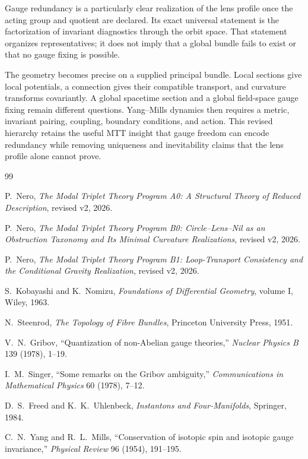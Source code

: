 \documentclass[11pt]{article}
\begin{document}
Gauge redundancy is a particularly clear realization of the lens profile once
the acting group and quotient are declared.  Its exact universal statement is
the factorization of invariant diagnostics through the orbit space.  That
statement organizes representatives; it does not imply that a global bundle
fails to exist or that no gauge fixing is possible.

The geometry becomes precise on a supplied principal bundle.  Local sections
give local potentials, a connection gives their compatible transport, and
curvature transforms covariantly.  A global spacetime section and a global
field-space gauge fixing remain different questions.  Yang--Mills dynamics
then requires a metric, invariant pairing, coupling, boundary conditions, and
action.  This revised hierarchy retains the useful MTT insight that gauge
freedom can encode redundancy while removing uniqueness and inevitability
claims that the lens profile alone cannot prove.

\begin{thebibliography}{99}

P.~Nero,
\newblock \emph{The Modal Triplet Theory Program A0: A Structural Theory of
Reduced Description}, revised v2, 2026.

P.~Nero,
\newblock \emph{The Modal Triplet Theory Program B0: Circle--Lens--Nil as an
Obstruction Taxonomy and Its Minimal Curvature Realizations},
revised v2, 2026.

P.~Nero,
\newblock \emph{The Modal Triplet Theory Program B1: Loop-Transport
Consistency and the Conditional Gravity Realization},
revised v2, 2026.

S.~Kobayashi and K.~Nomizu,
\newblock \emph{Foundations of Differential Geometry}, volume I,
Wiley, 1963.

N.~Steenrod,
\newblock \emph{The Topology of Fibre Bundles},
Princeton University Press, 1951.

V.~N.~Gribov,
\newblock ``Quantization of non-Abelian gauge theories,''
\emph{Nuclear Physics B} 139 (1978), 1--19.

I.~M.~Singer,
\newblock ``Some remarks on the Gribov ambiguity,''
\emph{Communications in Mathematical Physics} 60 (1978), 7--12.

D.~S.~Freed and K.~K.~Uhlenbeck,
\newblock \emph{Instantons and Four-Manifolds},
Springer, 1984.

C.~N.~Yang and R.~L.~Mills,
\newblock ``Conservation of isotopic spin and isotopic gauge invariance,''
\emph{Physical Review} 96 (1954), 191--195.

\end{thebibliography}
\end{document}

